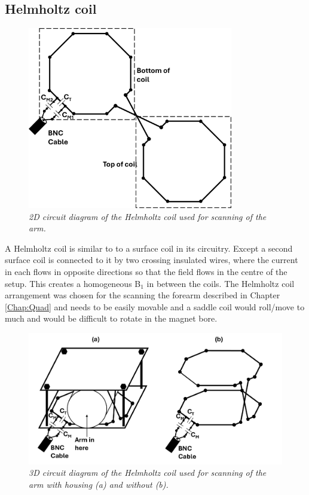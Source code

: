 \subsection{Helmholtz coil}

\begin{figure}
    \centering
    \includegraphics[width=0.8\textwidth]{Figures/Coils/Planar_Helmholtz.png}
    \caption{\textit{2D circuit diagram of the Helmholtz coil used for scanning of the arm.}}
    \label{fig:coils:2D_Helmholtz}
\end{figure}

A Helmholtz coil is similar to to a surface coil in its circuitry. Except a second surface coil is connected to it by two crossing insulated wires, where the current in each flows in opposite directions so that the field flows in the centre of the setup. This creates a homogeneous B$_1$ in between the coils. The Helmholtz coil arrangement was chosen for the scanning the forearm described in Chapter \ref{Chap:Quad} and needs to be easily movable and a saddle coil would roll/move to much and would be difficult to rotate in the magnet bore.

\begin{figure}
    \centering
    \includegraphics[width=1\textwidth]{Figures/Coils/3D_Helmholtz.png}
    \caption{\textit{3D circuit diagram of the Helmholtz coil used for scanning of the arm with housing (a) and without (b).}}
    \label{fig:coils:3D_Helmholtz}
\end{figure}

